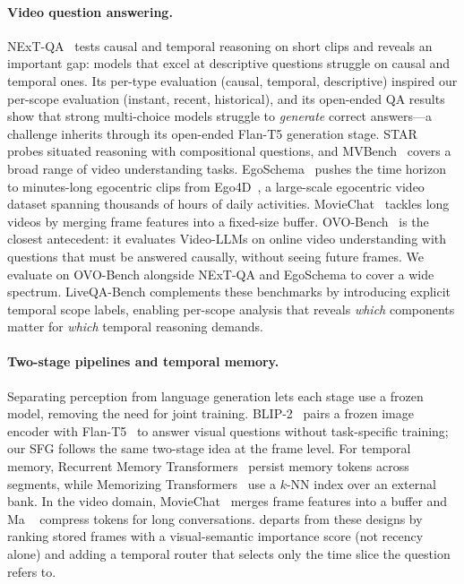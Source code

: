 \paragraph{Video question answering.}
NExT-QA~\cite{xiao2021nextqa} tests causal and temporal reasoning on short clips and reveals an important gap: models that excel at descriptive questions struggle on causal and temporal ones.
Its per-type evaluation (causal, temporal, descriptive) inspired our per-scope evaluation (instant, recent, historical), and its open-ended QA results show that strong multi-choice models struggle to \emph{generate} correct answers---a challenge \ours inherits through its open-ended Flan-T5 generation stage.
STAR~\cite{wu2021star} probes situated reasoning with compositional questions, and MVBench~\cite{li2024mvbench} covers a broad range of video understanding tasks.
EgoSchema~\cite{mangalam2023egoschema} pushes the time horizon to minutes-long egocentric clips from Ego4D~\cite{grauman2022ego4d}, a large-scale egocentric video dataset spanning thousands of hours of daily activities.
MovieChat~\cite{song2024moviechat} tackles long videos by merging frame features into a fixed-size buffer.
OVO-Bench~\cite{li2025ovobench} is the closest antecedent: it evaluates Video-LLMs on online video understanding with questions that must be answered causally, without seeing future frames.
We evaluate on OVO-Bench alongside NExT-QA and EgoSchema to cover a wide spectrum.
LiveQA-Bench complements these benchmarks by introducing explicit temporal scope labels, enabling per-scope analysis that reveals \emph{which} components matter for \emph{which} temporal reasoning demands.

\paragraph{Two-stage pipelines and temporal memory.}
Separating perception from language generation lets each stage use a frozen model, removing the need for joint training.
BLIP-2~\cite{li2023blip2} pairs a frozen image encoder with Flan-T5~\cite{chung2022flanT5} to answer visual questions without task-specific training; our SFG follows the same two-stage idea at the frame level.
For temporal memory, Recurrent Memory Transformers~\cite{bulatov2022recurrent} persist memory tokens across segments, while Memorizing Transformers~\cite{wu2022memorizing} use a $k$-NN index over an external bank.
In the video domain, MovieChat~\cite{song2024moviechat} merges frame features into a buffer and Ma \etal~\cite{ma2023livelylivechat} compress tokens for long conversations.
\ours departs from these designs by ranking stored frames with a visual-semantic importance score (not recency alone) and adding a temporal router that selects only the time slice the question refers to.

